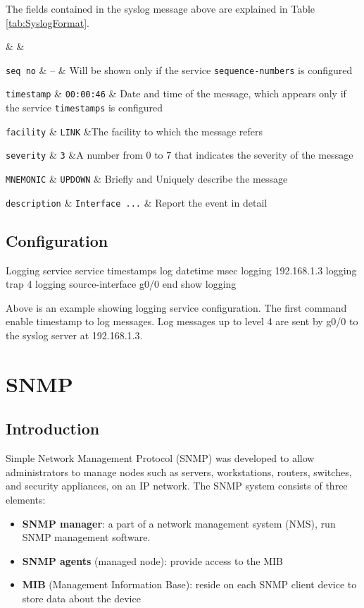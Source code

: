 The fields contained in the syslog message above are explained in Table \ref{tab:SyslogFormat}.

 &  &\w

\verb|seq no| & -- & Will be shown only if the service \verb|sequence-numbers| is configured \w

\verb|timestamp| & \verb|00:00:46| & Date and time of the message, which appears only if the service \verb|timestamps| is configured \w

\verb|facility| & \verb|LINK| &The facility to which the message refers \w

\verb|severity| &  \verb|3| &A number from 0 to 7  that indicates the severity of the message \w

\verb|MNEMONIC| & \verb|UPDOWN| & Briefly and Uniquely describe the message\w

\verb|description| & \verb|Interface ...| & Report the event in detail\w
\tableEnd

\subsection{Configuration}

\begin{sexylisting}{Logging service}
service timestamps log datetime msec
logging 192.168.1.3
logging trap 4
logging source-interface g0/0
end
show logging
\end{sexylisting}

Above is an example showing logging service configuration. The first command enable timestamp to log messages. Log messages up to level 4 are sent by g0/0 to the syslog server at 192.168.1.3.

\section{SNMP}

\subsection{Introduction}

Simple Network Management Protocol (SNMP) was developed to allow administrators to manage nodes such as servers, workstations, routers, switches, and security appliances, on an IP network. The SNMP system consists of three elements:

\begin{itemize}
\item \textbf{SNMP manager}: a part of a network management system (NMS), run SNMP management software. 
\item \textbf{SNMP agents} (managed node):  provide access to the MIB
\item \textbf{MIB} (Management Information Base): reside on each SNMP client device to store data about the device
\end{itemize}

